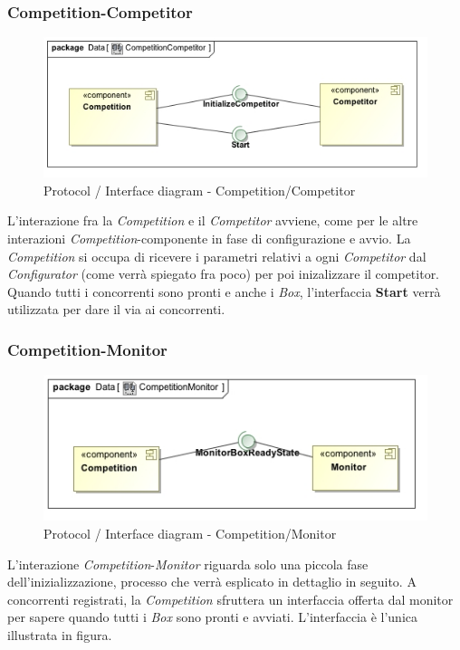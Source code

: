 \subsubsection{Competition-Competitor}
\begin{center}
\begin{figure}[h!]
	\includegraphics[scale=0.55]{img/InteractionDiagram/Implementation_Diagram__CompetitionCompetitor.jpg}
\caption{Protocol / Interface diagram - Competition/Competitor}
\end{figure}
\end{center}
L'interazione fra la \emph{Competition} e il \emph{Competitor} avviene, come per le altre interazioni \emph{Competition}-componente in fase di configurazione
e avvio. La \emph{Competition} si occupa di ricevere i parametri relativi a ogni \emph{Competitor} dal \emph{Configurator} (come verr\`{a} spiegato fra poco) per 
poi inizalizzare il competitor. Quando tutti i concorrenti sono pronti e anche i \emph{Box}, l'interfaccia \textbf{Start} verr\`{a} utilizzata per dare il
via ai concorrenti.
\subsubsection{Competition-Monitor}
\begin{center}
\begin{figure}[h!]
	\includegraphics[scale=0.55]{img/InteractionDiagram/Implementation_Diagram__CompetitionMonitor.jpg}
\caption{Protocol / Interface diagram - Competition/Monitor}
\end{figure}
\end{center}
L'interazione \emph{Competition}-\emph{Monitor} riguarda solo una piccola fase dell'inizializzazione, processo che verr\`{a} esplicato in dettaglio in seguito.
A concorrenti registrati, la \emph{Competition} sfruttera un interfaccia offerta dal monitor per sapere quando tutti i \emph{Box} sono pronti e avviati.
L'interfaccia \`{e} l'unica illustrata in figura.
\clearpage
